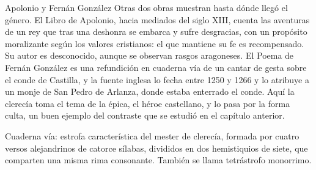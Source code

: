 \documentclass{book}
\begin{document}
\begin{tcolorbox}[title={Definición}, studiumdef, breakable]

Apolonio y Fernán González
Otras dos obras muestran hasta dónde llegó el género. El Libro de Apolonio, hacia mediados del siglo XIII, cuenta las aventuras de un rey que tras una deshonra se embarca y sufre desgracias, con un propósito moralizante según los valores cristianos: el que mantiene su fe es recompensado. Su autor es desconocido, aunque se observan rasgos aragoneses. El Poema de Fernán González es una refundición en cuaderna vía de un cantar de gesta sobre el conde de Castilla, y la fuente inglesa lo fecha entre 1250 y 1266 y lo atribuye a un monje de San Pedro de Arlanza, donde estaba enterrado el conde. Aquí la clerecía toma el tema de la épica, el héroe castellano, y lo pasa por la forma culta, un buen ejemplo del contraste que se estudió en el capítulo anterior.

\end{tcolorbox}

\begin{tcolorbox}[title={Definición}, studiumdef, breakable]

Cuaderna vía: estrofa característica del mester de clerecía, formada por cuatro versos alejandrinos de catorce sílabas, divididos en dos hemistiquios de siete, que comparten una misma rima consonante. También se llama tetrástrofo monorrimo.

\end{tcolorbox}
\end{document}
